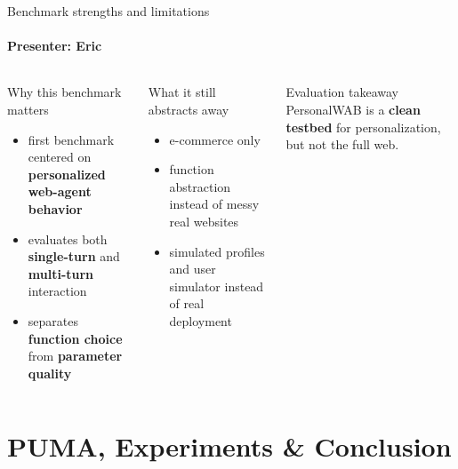 \documentclass[10pt]{beamer}
\newcommand{\speaker}[1]{\framesubtitle{Presenter: #1}}
\begin{document}
\begin{frame}{Benchmark strengths and limitations}
  \speaker{Eric}
  \begin{columns}[T,onlytextwidth]
      \begin{block}{Why this benchmark matters}
        \small
        \begin{itemize}
          \item first benchmark centered on \textbf{personalized web-agent behavior}
          \item evaluates both \textbf{single-turn} and \textbf{multi-turn} interaction
          \item separates \textbf{function choice} from \textbf{parameter quality}
        \end{itemize}
      \end{block}
      \begin{block}{What it still abstracts away}
        \small
        \begin{itemize}
          \item e-commerce only
          \item function abstraction instead of messy real websites
          \item simulated profiles and user simulator instead of real deployment
        \end{itemize}
      \end{block}
      \begin{alertblock}{Evaluation takeaway}
        \small PersonalWAB is a \textbf{clean testbed} for personalization, but not the full web.
      \end{alertblock}
  \end{columns}
\end{frame}

\section{PUMA, Experiments \& Conclusion}
\end{document}
